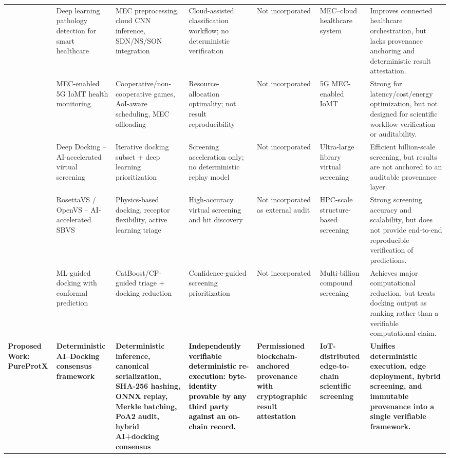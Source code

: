\documentclass[conference]{IEEEtran}
\begin{document}
\begin{table}[!htbp]
{\begin{tabular}{p{1.5cm} p{3.5cm} p{3.5cm} p{2.4cm} p{2.9cm} p{2.9cm} p{3.8cm}}
\cite{hossain2020deep} & Deep learning pathology detection for smart healthcare & MEC preprocessing, cloud CNN inference, SDN/NS/SON integration & Cloud-assisted classification workflow; no deterministic verification & Not incorporated & MEC--cloud healthcare system & Improves connected healthcare orchestration, but lacks provenance anchoring and deterministic result attestation. \\

\cite{ning2020mobile} & MEC-enabled 5G IoMT health monitoring & Cooperative/non-cooperative games, AoI-aware scheduling, MEC offloading & Resource-allocation optimality; not result reproducibility & Not incorporated & 5G MEC-enabled IoMT & Strong for latency/cost/energy optimization, but not designed for scientific workflow verification or auditability. \\

\cite{gentile2022artificial} & Deep Docking -- AI-accelerated virtual screening & Iterative docking subset + deep learning prioritization & Screening acceleration only; no deterministic replay model & Not incorporated & Ultra-large library virtual screening & Efficient billion-scale screening, but results are not anchored to an auditable provenance layer. \\

\cite{zhou2024artificial} & RosettaVS / OpenVS -- AI-accelerated SBVS & Physics-based docking, receptor flexibility, active learning triage & High-accuracy virtual screening and hit discovery & Not incorporated as external audit & HPC-scale structure-based screening & Strong screening accuracy and scalability, but does not provide end-to-end reproducible verification of predictions. \\

\cite{luttens2025rapid} & ML-guided docking with conformal prediction & CatBoost/CP-guided triage + docking reduction & Confidence-guided screening prioritization & Not incorporated & Multi-billion compound screening & Achieves major computational reduction, but treats docking output as ranking rather than a verifiable computational claim. \\

\textbf{Proposed Work: PureProtX} & \textbf{Deterministic AI--Docking consensus framework} & \textbf{Deterministic inference, canonical serialization, SHA-256 hashing, ONNX replay, Merkle batching, PoA2 audit, hybrid AI+docking consensus} & \textbf{\textcolor{black}{Independently verifiable deterministic re-execution:
byte-identity provable by any third party against an on-chain record.}} & \textbf{Permissioned blockchain-anchored provenance with cryptographic result attestation} & \textbf{IoT-distributed edge-to-chain scientific screening} & \textbf{Unifies deterministic execution, edge deployment, hybrid screening, and immutable provenance into a single verifiable framework.} \\

\hline
\end{tabular}
}
\end{table}
\end{document}
